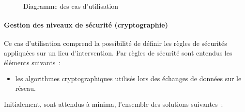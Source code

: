 \begin{figure}[htbp]
	\caption{Diagramme des cas d'utilisation}
\end{figure}

\paragraph{Gestion des niveaux de sécurité (cryptographie)}
Ce cas d'utilisation comprend la possibilité de définir les règles de sécurités appliquées sur un lieu d'intervention. Par règles de sécurité sont entendus les éléments suivants~:
\begin{itemize}
	\item les algorithmes cryptographiques utilisés lors des échanges de données sur le réseau.
\end{itemize}
Initialement, sont attendus à minima, l'ensemble des solutions suivantes~:


